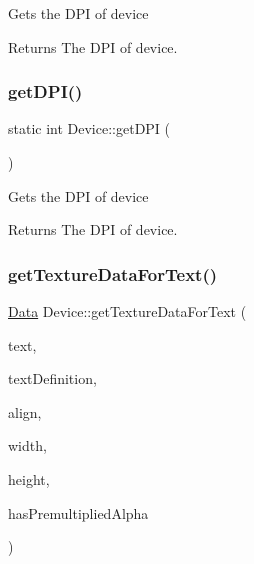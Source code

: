 Gets the D\+PI of device \begin{DoxyReturn}{Returns}
The D\+PI of device. 
\end{DoxyReturn}
\mbox{\label{classDevice_a2d54634bb1cb52d1d937716e6046fab7}} 
\subsubsection{\texorpdfstring{get\+D\+P\+I()}{getDPI()}\hspace{0.1cm}{\footnotesize\ttfamily [2/2]}}
{\footnotesize\ttfamily static int Device\+::get\+D\+PI (\begin{DoxyParamCaption}{ }\end{DoxyParamCaption})\hspace{0.3cm}{\ttfamily [static]}}

Gets the D\+PI of device \begin{DoxyReturn}{Returns}
The D\+PI of device. 
\end{DoxyReturn}
\mbox{\label{classDevice_a5f31fe5af17abb0fa201169eff7ee8a7}} 
\subsubsection{\texorpdfstring{get\+Texture\+Data\+For\+Text()}{getTextureDataForText()}\hspace{0.1cm}{\footnotesize\ttfamily [1/2]}}
{\footnotesize\ttfamily \hyperlink{classData}{Data} Device\+::get\+Texture\+Data\+For\+Text (\begin{DoxyParamCaption}\item[{const char $\ast$}]{text,  }\item[{const \hyperlink{structFontDefinition}{Font\+Definition} \&}]{text\+Definition,  }\item[{\hyperlink{classDevice_a62f8577d4803c8fce764f7cdff2abe92}{Text\+Align}}]{align,  }\item[{int \&}]{width,  }\item[{int \&}]{height,  }\item[{bool \&}]{has\+Premultiplied\+Alpha }\end{DoxyParamCaption})\hspace{0.3cm}{\ttfamily [static]}}

